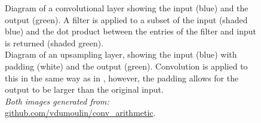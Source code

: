 \documentclass[11pt,a4paper,onecolumn]{report}
\begin{document}
\begin{figure}%
  \centering
  \qquad
  \caption[ Diagram of a convolutional layer
   Diagram of an upsampling
  layer]{ Diagram of a convolutional layer showing the
  input (blue) and the output (green). A filter is applied to a subset of the
  input (shaded blue) and the dot product between the entries of the filter and
  input is returned (shaded green). \\
   Diagram of an upsampling layer, showing the input
  (blue) with padding (white) and the output (green). Convolution is applied to
  this in the same way as in , however, the padding
  allows for the output to be larger than the original input.\\
  \textit{Both images generated from:}
  \url{github.com/vdumoulin/conv_arithmetic}.}
  \end{figure}

%
\end{document}
